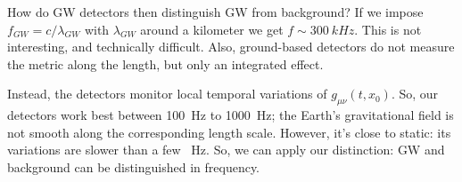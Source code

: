 \documentclass[main.tex]{subfiles}
\begin{document}
How do GW detectors then distinguish GW from background? 
If we impose \(f_{GW} = c / \lambda_{GW}\) with \(\lambda_{GW}\) around a kilometer we get \(f \sim \SI{300}{kHz}\). This is not interesting, and technically difficult. 
Also, ground-based detectors do not measure the metric along the length, but only an integrated effect. 

Instead, the detectors monitor local temporal variations of \(g_{\mu \nu } (t, x_0 )\). 
So, our detectors work best between \SI{100}{Hz} to \SI{1000}{Hz}; the Earth's gravitational field is not smooth along the corresponding length scale. However, it's close to static: its variations are slower than a few \SI{}{Hz}.
So, we can apply our distinction: GW and background can be distinguished in frequency. 
\end{document}
